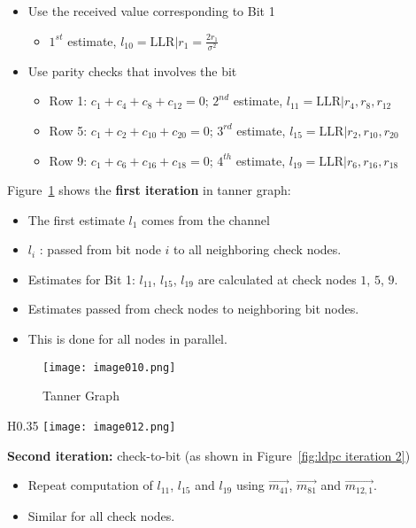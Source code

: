 \begin{itemize}
    \item Use the received value corresponding to Bit 1
    \begin{itemize}
        \item $1^{st}$ estimate, $l_{10} = \text{LLR} | r_1 = \frac{2r_1}{\sigma^2}$
    \end{itemize}
    \item Use parity checks that involves the bit
    \begin{itemize}
        \item Row 1: $c_1 + c_4 + c_8 + c_{12} = 0$; $2^{nd}$ estimate, $l_{11} = \text{LLR} | r_4 , r_8 , r_{12}$
        \item Row 5: $c_1 + c_2 + c_{10} + c_{20} = 0$; $3^{rd}$ estimate, $l_{15} = \text{LLR} | r_2 , r_{10} , r_{20}$
        \item Row 9: $c_1 + c_6 + c_{16} + c_{18} = 0$; $4^{th}$ estimate, $l_{19} = \text{LLR} | r_6 , r_{16} , r_{18}$
    \end{itemize}
\end{itemize}

Figure~\ref{fig:tanner graph ldpc} shows the \textbf{first iteration} in tanner graph:
\begin{itemize}
    \item The first estimate $l_1$ comes from the channel
    \item $l_i$ : passed from bit node $i$ to all neighboring check nodes.
    \item Estimates for Bit 1: $l_{11}$, $l_{15}$, $l_{19}$ are calculated at check nodes $1$, $5$, $9$.
    \item Estimates passed from check nodes to neighboring bit nodes.
    \item This is done for all nodes in parallel.
\end{itemize}

\begin{figure}[ht]
    \centering
    \texttt{[image: image010.png]}
    \caption{Tanner Graph}
    \label{fig:tanner graph ldpc}
\end{figure}

\begin{wrapfigure}{H}{0.35\textwidth}
    \centering
    \texttt{[image: image012.png]}
    \caption{Second Iteration}
    \label{fig:ldpc iteration 2}
\end{wrapfigure}

\textbf{Second iteration:} check-to-bit (as shown in Figure~\ref{fig:ldpc iteration 2})
\begin{itemize}
    \item Repeat computation of $l_{11}$, $l_{15}$ and $l_{19}$ using $\overrightarrow{m_{41}}$, $\overrightarrow{m_{81}}$ and $\overrightarrow{m_{12,1}}$.
    \item Similar for all check nodes. 
\end{itemize}

